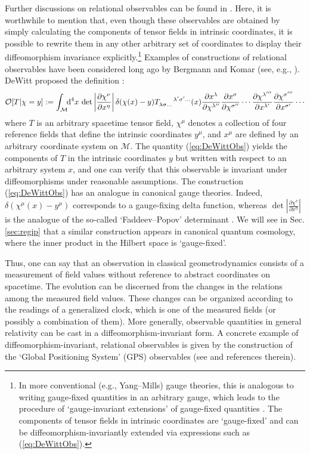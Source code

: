 \documentclass[12pt]{iopart}
\def\eq#1{\begin{equation}\begin{aligned}#1\end{aligned}\end{equation}}
\def\eref#1{(\ref{eq:#1})}
\def\D{\mathrm{d}}
\def\del#1#2{\frac{\partial#1}{\partial#2}}
\begin{document}
Further discussions on relational observables can be found in \cite{Tambornino:2011vg,Chataig:Thesis}. Here, it is worthwhile to mention that, even though these observables are obtained by simply calculating the components of tensor fields in intrinsic coordinates, it is possible to rewrite them in any other arbitrary set of coordinates to display their diffeomorphism invariance explicitly.\footnote{In more conventional (e.g., Yang--Mills) gauge theories, this is analogous to writing gauge-fixed quantities in an arbitrary gauge, which leads to the procedure of `gauge-invariant extensions' of gauge-fixed quantities \citep{HT:book}. The components of tensor fields in intrinsic coordinates are `gauge-fixed' and can be diffeomorphism-invariantly extended via expressions such as \eref{DeWittObs}.} Examples of constructions of relational observables have been considered long ago by Bergmann and Komar (see, e.g., \cite{Komar:Motions,Komar:1958ymq,Bergmann:1960wb,Bergmann:1961wa,Komar:1971rg,Komar:1974ah}). DeWitt proposed the definition \citep{DeWitt:1962cg}:
\eq{\label{eq:DeWittObs}
\mathcal{O}[T|\chi = y] := \int_{\mathcal{M}}\!\!\D^4x\,\det\left|\frac{\partial \chi^{\nu}}{\partial x^{\eta}}\right|\delta(\chi(x)-y) \tensor{T}{_\lambda_\sigma_{\ldots}^{\lambda'\sigma'\ldots}}(x)\del{x^{\lambda}}{\chi^{\lambda''}}\del{x^{\sigma}}{\chi^{\sigma''}}\cdots\del{\chi^{\lambda'''}}{x^{\lambda'}}\del{\chi^{\sigma'''}}{x^{\sigma'}}\cdots
}
where $T$ is an arbitrary spacetime tensor field, $\chi^{\mu}$ denotes a collection of four reference fields that define the intrinsic coordinates $y^{\mu}$, and $x^{\mu}$ are defined by an arbitrary coordinate system on $\mathcal{M}$. The quantity \eref{DeWittObs} yields the components of $T$ in the intrinsic coordinates $y$ but written with respect to an arbitrary system $x$, and one can verify that this observable is invariant under diffeomorphisms under reasonable assumptions. The construction \eref{DeWittObs} has an analogue in canonical gauge theories. Indeed, $\delta(\chi^{\mu}(x)-y^{\mu})$ corresponds to a gauge-fixing delta function, whereas $\det\left|\frac{\partial \chi^{\nu}}{\partial x^{\eta}}\right|$ is the analogue of the so-called `Faddeev--Popov' determinant \citep{Faddeev:1967fc,Faddeev:1973zb,HT:book}. We will see in Sec. \ref{sec:regip} that a similar construction appears in canonical quantum cosmology, where the inner product in the Hilbert space is `gauge-fixed'.

Thus, one can say that an observation in classical geometrodynamics consists of a measurement of field values without reference to abstract coordinates on spacetime. The evolution can be discerned from the changes in the relations among the measured field values. These changes can be organized according to the readings of a generalized clock, which is one of the measured fields (or possibly a combination of them). More generally, observable quantities in general relativity can be cast in a diffeomorphism-invariant form. A concrete example of diffeomorphism-invariant, relational observables is given by the construction of the `Global Positioning System' (GPS) observables (see \cite{Rovelli:2001my,PhysRevD.65.044018}  and references therein).
\end{document}
